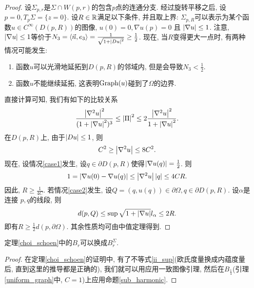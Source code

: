 \begin{proof}
    设$\Sigma_{p,r}$是$\Sigma \cap W(p,r)$的包含$p$点的连通分支.  经过旋转平移之后, 设$p =0, T_p\Sigma = \{z=0\}$. 设$R \in \mathbb{R}$满足以下条件, 并且取上界: $\Sigma_{p,R}$可以表示为某个函数$u \in C^\infty(D(p,R))$的图像, $u(0)=0, \nabla u(p)=0$ 且 $\left | \nabla u \right | \le 1$. 注意, $\left | \nabla u \right | \le 1$等价于$N_3={\left < \vec{n}, e_3 \right >}=\frac{1}{\sqrt{1+\left | Du \right |^2}} \ge \frac{1}{2}$. 现在, 当$R$变得更大一点时, 有两种情况可能发生:
    \begin{enumerate}
        \item 函数$u$可以光滑地延拓到$D(p,R)$的邻域内, 但是会导致$N_3< \frac{1}{2}$. \label{case1}
        \item 函数$u$不能继续延拓, 这表明$\text{Graph}(u)$碰到了$\Omega$的边界. \label{case2}
    \end{enumerate}
    直接计算可知, 我们有如下的比较关系
    \begin{equation}
        \frac{\left | \nabla^2 u \right |^2}{(1+\left | \nabla u \right |^2)^3} \le \left | {\Pi} \right |^2 \le 2 \frac{\left | \nabla^2 u \right |^2}{1+\left | \nabla u \right |^2}.
    \end{equation}
    在$D(p,R)$上, 由于$\left | Du \right | \le 1$, 则
    \begin{equation}
        C^2 \ge \left | \nabla^2 u \right | \le 8C^2.
    \end{equation}
    现在, 设情况\eqref{case1}发生, 设$q \in \partial D(p,R)$使得$\left | \nabla u(q) \right |=\frac{1}{2}$. 则
    \begin{equation}
        1=\left | \nabla u(0)-\nabla u(q) \right | \le \left | \nabla^2 u \right |\left | q \right |\le 4CR.
    \end{equation}
    因此, $R \ge \frac{1}{4C}$.
    若情况\eqref{case2}发生,  设$Q=(q,u(q))\in \partial \Omega, q \in \partial D(p,R)$. 设$\alpha$是连接 $p,q$的线段, 则
    \begin{equation}
        d(p,Q) \le \sup \sqrt{1+\left | \nabla u \right |}l_\alpha \le 2R.
    \end{equation}
    即有$R \ge \frac{1}{2}{d(p,\partial \Omega)}$.  其余性质均可由中值定理得到.
\end{proof}
\begin{corollary} \label{choi_schoen_intrinsic}
    定理\eqref{choi_schoen}中的$B_r$可以换成$B^\Sigma_r$.
\end{corollary}
\begin{proof}
    在定理\eqref{choi_schoen}的证明中, 有了不等式\eqref{ii_sup}(欧氏度量换成内蕴度量后, 直到这里的推导都是正确的), 我们就可以用应用一致图像引理, 然后在$B_\frac{1}{4}$(引理\eqref{uniform_graph}中, $C=1$)上应用命题\eqref{sub_harmonic}.
\end{proof}
